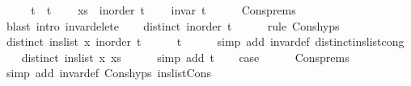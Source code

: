 \begin{isabellebody}
\ \ \isamarkupfalse%
\ \isamarkupfalse%
\ t\ \ t{\isacharcolon}{\kern0pt}\isanewline
\ \ \ \ {\isachardoublequoteopen}xs\ {\isacharequal}{\kern0pt}\ inorder\ t{\isachardoublequoteclose}\isanewline
\ \ \ \ {\isachardoublequoteopen}invar\ t{\isachardoublequoteclose}\isanewline
\ \ \ \ \isamarkupfalse%
\ Cons{\isachardot}{\kern0pt}prems\isanewline
\ \ \ \ \isamarkupfalse%
\ {\isacharparenleft}{\kern0pt}blast\ intro{\isacharcolon}{\kern0pt}\ invar{\isacharunderscore}{\kern0pt}delete{\isacharparenright}{\kern0pt}\isanewline
\ \ \isamarkupfalse%
\ {\isachardoublequoteopen}distinct\ {\isacharparenleft}{\kern0pt}inorder\ t{\isacharparenright}{\kern0pt}{\isachardoublequoteclose}\isanewline
\ \ \ \ \isamarkupfalse%
\ {\isacharparenleft}{\kern0pt}rule\ Cons{\isachardot}{\kern0pt}hyps{\isacharparenleft}{\kern0pt}{}{\isacharparenright}{\kern0pt}{\isacharparenright}{\kern0pt}\isanewline
\ \ \isamarkupfalse%
\ {\isachardoublequoteopen}distinct\ {\isacharparenleft}{\kern0pt}ins{\isacharunderscore}{\kern0pt}list\ x\ {\isacharparenleft}{\kern0pt}inorder\ t{\isacharparenright}{\kern0pt}{\isacharparenright}{\kern0pt}{\isachardoublequoteclose}\isanewline
\ \ \ \ \isamarkupfalse%
\ t{\isacharparenleft}{\kern0pt}{}{\isacharparenright}{\kern0pt}\isanewline
\ \ \ \ \isamarkupfalse%
\ {\isacharparenleft}{\kern0pt}simp\ add{\isacharcolon}{\kern0pt}\ invar{\isacharunderscore}{\kern0pt}def\ distinct{\isacharunderscore}{\kern0pt}ins{\isacharunderscore}{\kern0pt}list{\isacharunderscore}{\kern0pt}cong{\isacharparenright}{\kern0pt}\isanewline
\ \ \isamarkupfalse%
\ {\isachardoublequoteopen}distinct\ {\isacharparenleft}{\kern0pt}ins{\isacharunderscore}{\kern0pt}list\ x\ xs{\isacharparenright}{\kern0pt}{\isachardoublequoteclose}\isanewline
\ \ \ \ \isamarkupfalse%
\ {\isacharparenleft}{\kern0pt}simp\ add{\isacharcolon}{\kern0pt}\ t{\isacharparenleft}{\kern0pt}{}{\isacharparenright}{\kern0pt}{\isacharparenright}{\kern0pt}\isanewline
\ \ \isamarkupfalse%
\ {\isacharquery}{\kern0pt}case\isanewline
\ \ \ \ \isamarkupfalse%
\ Cons{\isachardot}{\kern0pt}prems\isanewline
\ \ \ \ \isamarkupfalse%
\ {\isacharparenleft}{\kern0pt}simp\ add{\isacharcolon}{\kern0pt}\ invar{\isacharunderscore}{\kern0pt}def\ Cons{\isachardot}{\kern0pt}hyps{\isacharparenleft}{\kern0pt}{}{\isacharparenright}{\kern0pt}\ ins{\isacharunderscore}{\kern0pt}list{\isacharunderscore}{\kern0pt}Cons{\isacharparenright}{\kern0pt}\isanewline
{}\isamarkupfalse%
%
\endisatagproof
{\isafoldproof}%
%
\isadelimproof
\isanewline
%
\endisadelimproof
%
\isadelimtheory
\isanewline
%
\endisadelimtheory
%
\isatagtheory
{}\isamarkupfalse%
%
\endisatagtheory
{\isafoldtheory}%
%
\isadelimtheory
%
\endisadelimtheory
%
\end{isabellebody}%
